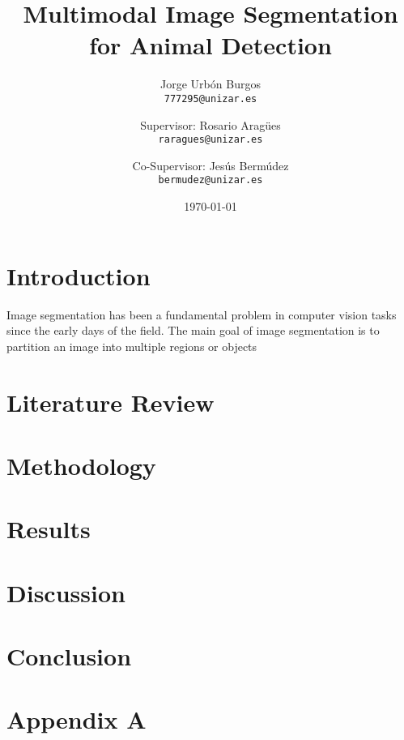 \documentclass[12pt,a4paper]{report}
\title{Multimodal Image Segmentation for Animal Detection}
\author{
    Jorge Urbón Burgos \\
    \texttt{777295@unizar.es}
    \and
    Supervisor: Rosario Aragües \\
    \texttt{raragues@unizar.es}
    \and
    Co-Supervisor: Jesús Bermúdez \\
    \texttt{bermudez@unizar.es}
}
\date{\today}
\begin{document}
\maketitle

\begin{abstract}
\end{abstract}

\tableofcontents

\chapter{Introduction}
\label{chap:introduction}
Image segmentation has been a fundamental problem in computer vision tasks since the early days of the field. The main goal of image segmentation is to partition an image into multiple regions or objects

\chapter{Literature Review}
\label{chap:literature_review}

\chapter{Methodology}
\label{chap:methodology}

\chapter{Results}
\label{chap:results}

\chapter{Discussion}
\label{chap:discussion}

\chapter{Conclusion}
\label{chap:conclusion}




\appendix
\chapter{Appendix A}
\label{chap:appendix_a}
\end{document}
